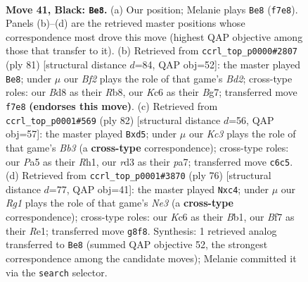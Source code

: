 \documentclass[11pt]{article}
\begin{document}
\clearpage

\begin{figure}[p]\centering
\begin{subfigure}{0.46\textwidth}\centering
\resizebox{\linewidth}{!}{%
\newchessgame
\chessboard[
  setfen={r2b2r1/1p3b1p/n1kN2pP/p3Pp2/P2p4/3R2P1/1B5K/R1N5 b - - 7 41},
  showmover=false,
  pgfstyle=straightmove, color=movearrow, markmove={f7-e8}
]}
\caption{}
\end{subfigure}\hfill
\begin{subfigure}{0.46\textwidth}\centering
\resizebox{\linewidth}{!}{%
\newchessgame
\chessboard[
  setfen={1r4k1/r2b2b1/6p1/2R1NpPp/p3p3/P1P5/1PB1RPP1/6K1 b - - 1 41},
  showmover=false,
  pgfstyle=straightmove, color=movearrow, markmove={d7-e8}
]}
\caption{}
\end{subfigure}
\\[4pt]
\begin{subfigure}{0.46\textwidth}\centering
\resizebox{\linewidth}{!}{%
\newchessgame
\chessboard[
  setfen={3rr3/pk4p1/1pp5/3n1p1b/P2P1B1P/1BP1P3/1R4K1/7R w - - 2 42},
  showmover=false,
  pgfstyle=straightmove, color=movearrow, markmove={b3-d5}
]}
\caption{}
\end{subfigure}\hfill
\begin{subfigure}{0.46\textwidth}\centering
\resizebox{\linewidth}{!}{%
\newchessgame
\chessboard[
  setfen={3r2k1/1p3p2/2n1p1bB/p5P1/P1p1PP2/3nN1K1/1P1r4/1B2R2R w - - 1 39},
  showmover=false,
  pgfstyle=straightmove, color=movearrow, markmove={e3-c4}
]}
\caption{}
\end{subfigure}
\caption{\textbf{Move 41, Black: \texttt{Be8}.} (a) Our position; Melanie plays \texttt{Be8} (\texttt{f7e8}). Panels (b)--(d) are the retrieved master positions whose correspondence most drove this move (highest QAP objective among those that transfer to it). (b) Retrieved from \texttt{ccrl\_top\_p0000\#2807} (ply 81) [structural distance $d$=84, QAP obj=52]: the master played \texttt{Be8}; under $\mu$ our \emph{Bf2} plays the role of that game's \emph{Bd2}; cross-type roles: our \emph{B}d8 as their \emph{R}b8, our \emph{K}c6 as their \emph{B}g7; transferred move \texttt{f7e8} \textbf{(endorses this move)}. (c) Retrieved from \texttt{ccrl\_top\_p0001\#569} (ply 82) [structural distance $d$=56, QAP obj=57]: the master played \texttt{Bxd5}; under $\mu$ our \emph{Kc3} plays the role of that game's \emph{Bb3} (a \textbf{cross-type} correspondence); cross-type roles: our \emph{P}a5 as their \emph{R}h1, our \emph{r}d3 as their \emph{p}a7; transferred move \texttt{c6c5}. (d) Retrieved from \texttt{ccrl\_top\_p0001\#3870} (ply 76) [structural distance $d$=77, QAP obj=41]: the master played \texttt{Nxc4}; under $\mu$ our \emph{Rg1} plays the role of that game's \emph{Ne3} (a \textbf{cross-type} correspondence); cross-type roles: our \emph{K}c6 as their \emph{B}b1, our \emph{B}f7 as their \emph{R}e1; transferred move \texttt{g8f8}. Synthesis: 1 retrieved analog transferred to \texttt{Be8} (summed QAP objective 52, the strongest correspondence among the candidate moves); Melanie committed it via the \texttt{search} selector.}
\label{fig:thought-m81}
\end{figure}
\end{document}
